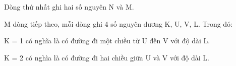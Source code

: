 Dòng thứ nhất ghi hai số nguyên N và M.  

   M dòng tiếp theo, mỗi dòng ghi 4 số nguyên dương K, U, V, L. Trong đó:  

   K = 1 có nghĩa là có đường đi một chiều từ U đến V với độ dài L.  

   K = 2 có nghìa là có đường đi hai chiều giữa U và V với độ dài L.